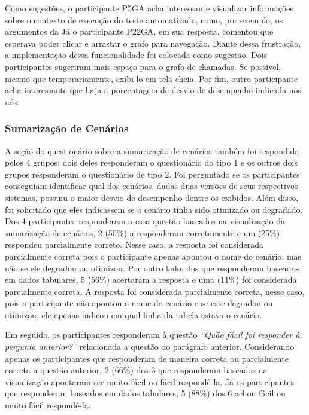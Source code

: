 Como sugestões, o participante P5GA acha interessante visualizar informações sobre o contexto de execução do teste automatizado, como, por exemplo, os argumentos da  Já o participante P22GA, em sua resposta, comentou que esperava poder clicar e arrastar o grafo para navegação. Diante dessa frustração, a implementação dessa funcionalidade foi colocada como sugestão. Dois participantes sugeriram mais espaço para o grafo de chamadas. Se possível, mesmo que temporariamente, exibi-lo em tela cheia. Por fim, outro participante acha interessante que haja a porcentagem de desvio de desempenho indicada nos nós.

\subsubsection{Sumarização de Cenários}

A seção do questionário sobre a sumarização de cenários também foi respondida pelos 4 grupos: dois deles responderam o questionário do tipo 1 e os outros dois grupos responderam o questionário de tipo 2. Foi perguntado se os participantes conseguiam identificar qual dos cenários, dadas duas versões de seus respectivos sistemas, possuiu o maior desvio de desempenho dentre os exibidos. Além disso, foi solicitado que eles indicassem se o cenário tinha sido otimizado ou degradado. Dos 4 participantes responderam a essa questão baseados na visualização da sumarização de cenários, 2 (50\%) a responderam corretamente e um (25\%) respondeu parcialmente correto. Nesse caso, a resposta foi considerada parcialmente correta pois o participante apenas apontou o nome do cenário, mas não se ele degradou ou otimizou. Por outro lado, dos que responderam baseados em dados tabulares, 5 (56\%) acertaram a resposta e uma (11\%) foi considerada parcialmente correta. A resposta foi considerada parcialmente correta, nesse caso, pois o participante não apontou o nome do cenário e se este degradou ou otimizou, ele apenas indicou em qual linha da tabela estava o cenário.

Em seguida, os participantes responderam à questão \textit{``Quão fácil foi responder à pergunta anterior?''} relacionada a questão do parágrafo anterior. Considerando apenas os participantes que responderam de maneira correta ou parcialmente correta a questão anterior, 2 (66\%) dos 3 que responderam baseados na visualização apontaram ser muito fácil ou fácil respondê-la. Já os participantes que responderam baseados em dados tabulares, 5 (88\%) dos 6 achou fácil ou muito fácil respondê-la.

